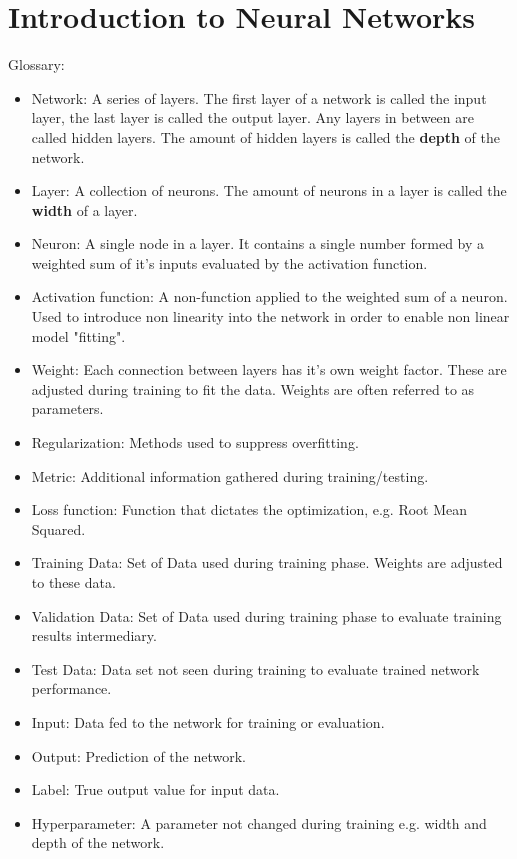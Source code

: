 	\section{Introduction to Neural Networks}
	Glossary: \label{Glossary}
	\begin{itemize}
		\item Network: A series of layers. The first layer of a network is called the input layer, the last layer is called the output layer. Any layers in between are called hidden layers. The amount of hidden layers is called the \textbf{depth} of the network.\\
		\item Layer: A collection of neurons. The amount of neurons in a layer is called the \textbf{width} of a layer.\\
		\item Neuron: A single node in a layer. It contains a single number formed by a weighted sum of it's inputs evaluated by the activation function.\\
		\item Activation function: A non-function applied to the weighted sum of a neuron. Used to introduce non linearity into the network in order to enable non linear model "fitting". %
		\item Weight: Each connection between layers has it's own weight factor. These are adjusted during training to fit the data. Weights are often referred to as parameters.\\
		\item Regularization: Methods used to suppress overfitting. \\%
		\item Metric: Additional information gathered during training/testing. \\
		\item Loss function: Function that dictates the optimization, e.g. Root Mean Squared. \\
		\item Training Data: Set of Data used during training phase. Weights are adjusted to these data. \\
		\item Validation Data: Set of Data used during training phase to evaluate training results intermediary. \\
		\item Test Data: Data set not seen during training to evaluate trained network performance. \\
		\item Input: Data fed to the network for training or evaluation.
		\item Output: Prediction of the network.
		\item Label: True output value for input data.
		\item Hyperparameter: A parameter not changed during training e.g. width and depth of the network.
	\end{itemize}
